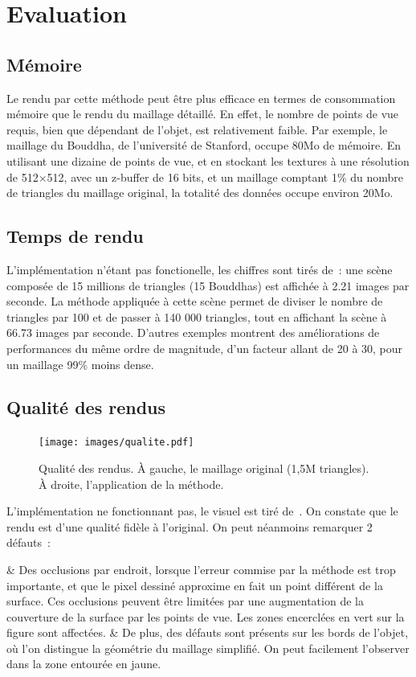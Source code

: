 \section{Evaluation}
\subsection{Mémoire}
Le rendu par cette méthode peut être plus efficace en termes de consommation mémoire que le rendu du maillage détaillé. En effet, le nombre de points
de vue requis, bien que dépendant de l'objet, est relativement faible. Par exemple, le maillage du Bouddha, de l'université de Stanford, occupe 80Mo de mémoire.
En utilisant une dizaine de points de vue, et en stockant les textures à une résolution de 512$\times$512, avec un z-buffer de 16 bits, et un maillage
comptant 1\% du nombre de triangles du maillage original, la totalité des données occupe environ 20Mo.

\subsection{Temps de rendu}
L'implémentation n'étant pas fonctionelle, les chiffres sont tirés de~\cite{SG05}: une scène composée de 15 millions de triangles (15 Bouddhas) est affichée
à 2.21 images par seconde. La méthode appliquée à cette scène permet de diviser le nombre de triangles par 100 et de passer à 140 000 triangles, tout en
affichant la scène à 66.73 images par seconde. D'autres exemples montrent des améliorations de performances du même ordre de magnitude, d'un facteur allant de 20 à 30,
pour un maillage 99\% moins dense.

\subsection{Qualité des rendus}
\begin{figure}\label{fig:qualite}
    \centering
    \caption{Qualité des rendus. \`A gauche, le maillage original (1,5M triangles). \`A droite, l'application de la méthode.}
    \texttt{[image: images/qualite.pdf]}
\end{figure}
L'implémentation ne fonctionnant pas, le visuel est tiré de~\cite{SG05}. On constate que le rendu est d'une qualité fidèle à l'original.
On peut néanmoins remarquer 2 défauts~:
\begin{easylist}[itemize]
& Des occlusions par endroit, lorsque l'erreur commise par la méthode est trop importante, et que le pixel dessiné approxime
en fait un point différent de la surface. Ces occlusions peuvent être limitées par une augmentation de la couverture de la
surface par les points de vue. Les zones encerclées en vert sur la figure sont affectées.
& De plus, des défauts sont présents sur les bords de l'objet, où l'on distingue la géométrie du maillage simplifié. On peut
facilement l'observer dans la zone entourée en jaune.
\end{easylist}

